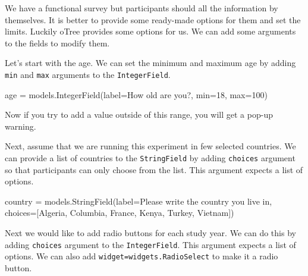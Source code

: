 \documentclass[
  letterpaper,
  DIV=11,
  numbers=noendperiod]{scrreprt}
\newenvironment{Shaded}{\begin{snugshade}}{\end{snugshade}}
\newcommand{\BuiltInTok}[1]{\textcolor[rgb]{0.00,0.23,0.31}{#1}}
\newcommand{\DecValTok}[1]{\textcolor[rgb]{0.68,0.00,0.00}{#1}}
\newcommand{\NormalTok}[1]{\textcolor[rgb]{0.00,0.23,0.31}{#1}}
\newcommand{\OperatorTok}[1]{\textcolor[rgb]{0.37,0.37,0.37}{#1}}
\newcommand{\StringTok}[1]{\textcolor[rgb]{0.13,0.47,0.30}{#1}}
\begin{document}
We have a functional survey but participants should all the information
by themselves. It is better to provide some ready-made options for them
and set the limits. Luckily oTree provides some options for us. We can
add some arguments to the fields to modify them.

Let's start with the age. We can set the minimum and maximum age by
adding \texttt{min} and \texttt{max} arguments to the
\texttt{IntegerField}.

\begin{Shaded}
\begin{Highlighting}[]
\NormalTok{age }\OperatorTok{=}\NormalTok{ models.IntegerField(label}\OperatorTok{=}\StringTok{\textquotesingle{}How old are you?\textquotesingle{}}\NormalTok{, }\BuiltInTok{min}\OperatorTok{=}\DecValTok{18}\NormalTok{, }\BuiltInTok{max}\OperatorTok{=}\DecValTok{100}\NormalTok{)}
\end{Highlighting}
\end{Shaded}

Now if you try to add a value outside of this range, you will get a
pop-up warning.

Next, assume that we are running this experiment in few selected
countries. We can provide a list of countries to the
\texttt{StringField} by adding \texttt{choices} argument so that
participants can only choose from the list. This argument expects a list
of options.

\begin{Shaded}
\begin{Highlighting}[]
\NormalTok{country }\OperatorTok{=}\NormalTok{ models.StringField(label}\OperatorTok{=}\StringTok{\textquotesingle{}Please write the country you live in\textquotesingle{}}\NormalTok{,}
\NormalTok{                            choices}\OperatorTok{=}\NormalTok{[}\StringTok{\textquotesingle{}Algeria\textquotesingle{}}\NormalTok{, }\StringTok{\textquotesingle{}Columbia\textquotesingle{}}\NormalTok{, }\StringTok{\textquotesingle{}France\textquotesingle{}}\NormalTok{, }\StringTok{\textquotesingle{}Kenya\textquotesingle{}}\NormalTok{, }\StringTok{\textquotesingle{}Turkey\textquotesingle{}}\NormalTok{, }\StringTok{\textquotesingle{}Vietnam\textquotesingle{}}\NormalTok{])}
\end{Highlighting}
\end{Shaded}

Next we would like to add radio buttons for each study year. We can do
this by adding \texttt{choices} argument to the \texttt{IntegerField}.
This argument expects a list of options. We can also add
\texttt{widget=widgets.RadioSelect} to make it a radio button.
\end{document}
